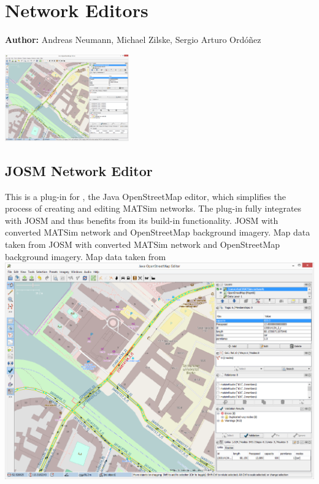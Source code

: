 \chapter{Network Editors}
\label{ch:networkeditor}

\hfill \textbf{Author:} Andreas Neumann, Michael Zilske, Sergio Arturo Ordóñez

\begin{center} \includegraphics[width=0.4\textwidth, angle=0]{extending/modules/networkeditor/josm_screenshot} \end{center}

\section{JOSM Network Editor}
This is a plug-in for \citet[][]{JOSM2014}, the Java OpenStreetMap editor, which simplifies the process of creating and editing MATSim networks. The plug-in fully integrates with JOSM and thus benefits from its build-in functionality.
%
\createfigure
{JOSM with converted MATSim network and OpenStreetMap background imagery. Map data taken from \citet[][]{OpenStreetMap2014}}
{JOSM with converted MATSim network and OpenStreetMap background imagery. Map data taken from \citet[][]{OpenStreetMap2014}}
{\label{fig:networkeditor_screenshot}}
{\includegraphics[width=1.0\textwidth]{extending/modules/networkeditor/josm_screenshot}}
{}

